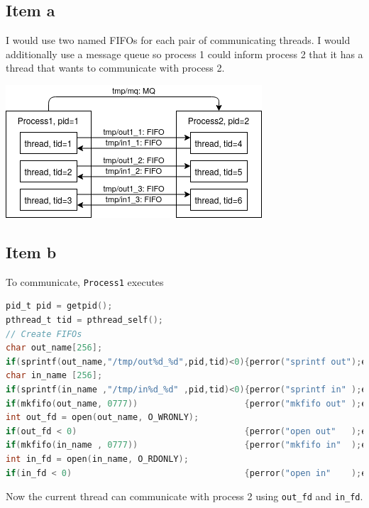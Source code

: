 {\subsection{Item a}
I would use two named FIFOs for each pair of communicating threads. I would additionally use a message queue so process 1 could inform process 2 that it has a thread that wants to communicate with process 2.
\begin{center}
    \includegraphics[scale=0.5]{2017N_07_a}
\end{center}

\subsection{Item b}
To communicate, \texttt{Process1} executes
\begin{lstlisting}[language=C,basicstyle=\small]
pid_t pid = getpid();
pthread_t tid = pthread_self();
// Create FIFOs
char out_name[256];
if(sprintf(out_name,"/tmp/out%d_%d",pid,tid)<0){perror("sprintf out");exit(1);}
char in_name [256];
if(sprintf(in_name ,"/tmp/in%d_%d" ,pid,tid)<0){perror("sprintf in" );exit(1);}
if(mkfifo(out_name, 0777))                     {perror("mkfifo out" );exit(1);}
int out_fd = open(out_name, O_WRONLY);
if(out_fd < 0)                                 {perror("open out"   );exit(1);}
if(mkfifo(in_name , 0777))                     {perror("mkfifo in"  );exit(1);}
int in_fd = open(in_name, O_RDONLY);
if(in_fd < 0)                                  {perror("open in"    );exit(1);}
\end{lstlisting}
Now the current thread can communicate with process 2 using \texttt{out\_fd} and \texttt{in\_fd}.

}
